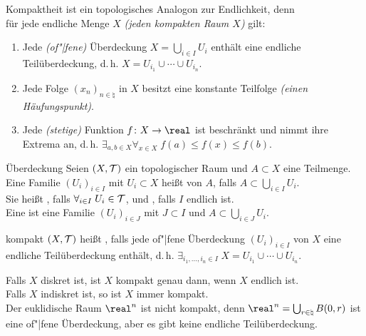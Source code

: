 \begin{Bem}
    Kompaktheit ist ein topologisches Analogon zur Endlichkeit, denn \\
    für jede endliche Menge $X$ \emph{(jeden kompakten Raum $X$)} gilt:
    \begin{enumerate}
        \item
        Jede \emph{(of"|fene)} Überdeckung $X = \bigcup_{i \in I} U_i$ enthält
        eine endliche Teilüberdeckung, d.\,h.
        $X = U_{i_1} \cup \dotsb \cup U_{i_n}$.
        
        \item
        Jede Folge $(x_n)_{n \in \natural}$ in $X$ besitzt eine konstante
        Teilfolge \emph{(einen Häufungspunkt)}.
        
        \item
        Jede \emph{(stetige)} Funktion $f\colon X \rightarrow \real$ ist
        beschränkt und nimmt ihre Extrema an, d.\,h.
        $\exists_{a, b \in X} \forall_{x \in X}\; f(a) \le f(x) \le f(b)$.
    \end{enumerate}
\end{Bem}

\linie

\begin{Def}{Überdeckung}
    Seien $(X, \mathcal{T})$ ein topologischer Raum und $A \subset X$ eine Teilmenge. \\
    Eine Familie $(U_i)_{i \in I}$ mit $U_i \subset X$ heißt
     von $A$, falls $A \subset \bigcup_{i \in I} U_i$. \\
    Sie heißt , falls $\forall_{i \in I}\; U_i \in \mathcal{T}$,
    und , falls $I$ endlich ist. \\
    Eine  ist eine Familie $(U_i)_{i \in J}$ mit
    $J \subset I$ und $A \subset \bigcup_{i \in J} U_i$.
\end{Def}

\begin{Def}{kompakt}
    $(X, \mathcal{T})$ heißt , falls jede of"|fene Überdeckung
    $(U_i)_{i \in I}$ von $X$ eine endliche Teilüberdeckung enthält, d.\,h.
    $\exists_{i_1, \dotsc, i_n \in I}\; X = U_{i_1} \cup \dotsb \cup U_{i_n}$.
\end{Def}

\begin{Bsp}
    Falls $X$ diskret ist, ist $X$ kompakt genau dann, wenn $X$ endlich ist. \\
    Falls $X$ indiskret ist, so ist $X$ immer kompakt. \\
    Der euklidische Raum $\real^n$ ist nicht kompakt, denn
    $\real^n = \bigcup_{r \in \natural} B(0, r)$ ist eine of"|fene Überdeckung,
    aber es gibt keine endliche Teilüberdeckung.
\end{Bsp}

